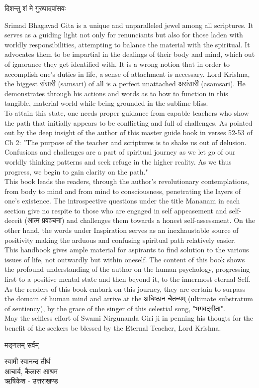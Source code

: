 \begin{center}
\large\devfont दिशन्तु शं मे गुरुपादपांसवः
\end{center}

{\small
Srimad Bhagavad Gita is a unique and unparalleled jewel among all scriptures. It serves as a guiding light not only for renunciants but also for those laden with worldly responsibilities, attempting to balance the material with the spiritual. It advocates them to be impartial in the dealings of their body and mind, which out of ignorance they get identified with. It is a wrong notion that in order to accomplish one's duties in life, a sense of attachment is necessary. Lord Krishna, the biggest संसारी (samsari) of all is a perfect unattached असंसारी (asamsari). He demonstrates through his actions and words as to how to function in this tangible, material world while being grounded in the sublime bliss.\\


To attain this state, one needs proper guidance from capable teachers who show the path that initially appears to be conflicting and full of challenges. As pointed out by the deep insight of the author of this master guide book  in verses 52-53 of Ch 2:
"The purpose of the teacher and scriptures is to shake us out of delusion. Confusions and challenges are a part of spiritual journey as we let go of our worldly thinking patterns and seek refuge in the higher reality. As we thus progress, we begin to gain clarity on the path."\\


This book leads the readers, through the author's revolutionary contemplations, from body to mind and from mind to consciousness, penetrating the layers of one's existence. The introspective questions under the title Mananam in each section give no respite to those who are engaged in self appeasement and self-deceit (आत्म प्रवञ्चना) and challenges them towards a honest self-assessment. On the other hand, the words under Inspiration serves as an inexhaustable source of positivity making the arduous and confusing spiritual path relatively easier.\\


This handbook gives ample material for aspirants to find solution to the various issues of life, not outwardly but within oneself. The content of this book shows the profound understanding of the author on the human psychology, progressing first to a positive mental state and then beyond it, to the innermost eternal Self. As the readers of this book embark on this journey, they are certain to surpass the domain of human mind and arrive at the अधिष्ठान चैतन्यम् (ultimate substratum of sentiency), by the grace of the singer of this celestial song, "भगवद्गीता".\\


May the selfless effort of Swami Nirgunanda Giri ji in penning his thougts for the benefit of the seekers be blessed by the Eternal Teacher, Lord Krishna.\\
}
\begin{center}
\devfont मङ्गलम्  सर्वम्
\end{center}

{\large\devfont स्वामी स्वानन्द तीर्थ\\}
\devfont आचार्य, कैलास आश्रम\\
\devfont ऋषिकेश - उत्तराखण्ड
\newpage
